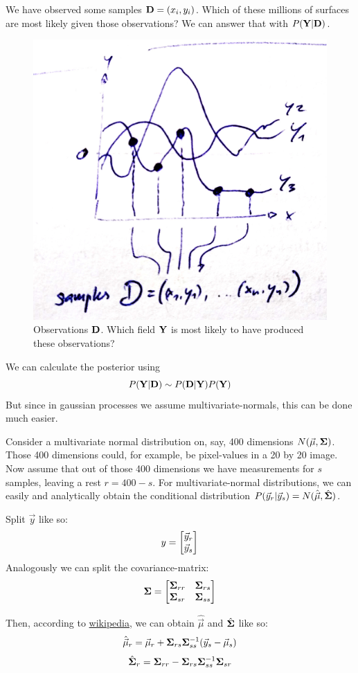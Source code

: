 We have observed some samples $\mathbf{D} = {(x_i, y_i)}$.
Which of these millions of surfaces are most likely given those observations? We can answer that with $P(\mathbf{Y}|\mathbf{D})$.
\begin{figure}[H]
    \caption{Observations $\mathbf{D}$. Which field $\mathbf{Y}$ is most likely to have produced these observations?}
    \centering
    \includegraphics[width=0.4\linewidth]{images/gp_observations.jpg}
\end{figure}

We can calculate the posterior using 
$$
P(\mathbf{Y}|\mathbf{D}) \sim P(\mathbf{D}|\mathbf{Y}) P(\mathbf{Y})
$$
But since in gaussian processes we assume multivariate-normals, this can be done much easier.

Consider a multivariate normal distribution on, say, 400 dimensions $N(\vec{\mu}, \mathbf{\Sigma})$. Those 400 dimensions could, for example, be pixel-values in a 20 by 20 image.
Now assume that out of those 400 dimensions we have measurements for $s$ samples, leaving a rest $r = 400 - s$.
For multivariate-normal distributions, we can easily and analytically obtain the conditional distribution $P(\vec{y}_r | \vec{y}_s) = N(\hat{\vec{\mu}}, \hat{\mathbf{\Sigma}})$.

Split $\vec{y}$ like so:
$$ y =  \begin{bmatrix} \vec{y}_r \\ \vec{y}_s \\ \end{bmatrix}  $$
Analogously we can split the covariance-matrix:
$$ \mathbf{\Sigma} = \begin{bmatrix}
    \mathbf{\Sigma}_{rr} & \mathbf{\Sigma}_{rs} \\
    \mathbf{\Sigma}_{sr} & \mathbf{\Sigma}_{ss} \\
\end{bmatrix}  $$

Then, according to \href{https://en.wikipedia.org/wiki/Multivariate_normal_distribution#Conditional_distributions}{wikipedia}, we can obtain $\hat{\vec{\mu}}$ and $\hat{\mathbf{\Sigma}}$ like so:
$$ \hat{\vec{\mu}}_r = \vec{\mu}_r + \mathbf{\Sigma}_{rs} \mathbf{\Sigma}_{ss}^{-1} (\vec{y}_s - \vec{\mu}_s) $$
$$ \hat{\mathbf{\Sigma}}_r = \mathbf{\Sigma}_{rr} - \mathbf{\Sigma}_{rs} \mathbf{\Sigma}_{ss}^{-1} \mathbf{\Sigma}_{sr} $$

